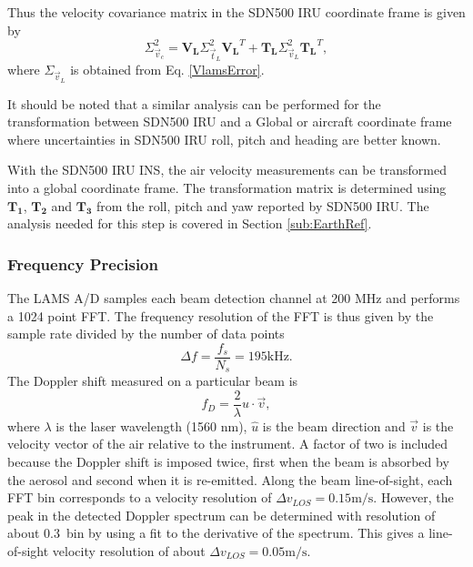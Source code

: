 \documentclass[12pt,twoside,english]{article}\usepackage[]{graphicx}\usepackage[]{color}
\begin{document}
Thus the velocity covariance matrix in the SDN500 IRU coordinate frame is given by  
\begin{equation}
\Sigma_{\vec{v}_{c}}^{2}=\mathbf{V_{L}}\Sigma_{\vec{t}_{L}}^{2}\mathbf{V_{L}}^{T}+\mathbf{T_{L}}\Sigma_{\vec{v}_{L}}^{2}\mathbf{T_{L}}^{T},\label{CMvelError} 
\end{equation}
where $\Sigma_{\vec{v}_{L}}$ is obtained from Eq. \eqref{VlamsError}. 

It should be noted that a similar analysis can be performed for the transformation between SDN500 IRU and a Global or aircraft coordinate frame where uncertainties in SDN500 IRU roll, pitch and heading are better known. 


With the SDN500 IRU INS, the air velocity measurements can be transformed into a global coordinate frame. The transformation matrix is determined using $\mathbf{T_{1}}$, $\mathbf{T_{2}}$ and $\mathbf{T_{3}}$ from the roll, pitch and yaw reported by SDN500 IRU. The analysis needed for this step is covered in Section \ref{sub:EarthRef}. 



\subsubsection{Frequency Precision\label{sub:FreqPrec}}

The LAMS A/D samples each beam detection channel at 200 MHz and performs a 1024 point FFT. The frequency resolution of the FFT is thus given by the sample rate divided by the number of data points  
\begin{equation}
\Delta f=\dfrac{f_{s}}{N_{s}}=195\mathrm{kHz}. 
\end{equation}
The Doppler shift measured on a particular beam is  
\begin{equation}
f_{D}=\frac{2}{\lambda}\hat{u}\cdot\vec{v},\label{DopplerShift} 
\end{equation}
where $\lambda$ is the laser wavelength (1560 nm), $\hat{u}$ is the beam direction and $\vec{v}$ is the velocity vector of the air relative to the instrument. A factor of two is included because the Doppler shift is imposed twice, first when the beam is absorbed by the aerosol and second when it is re-emitted. Along the beam line-of-sight, each FFT bin corresponds to a velocity resolution of $\Delta v_{LOS}=0.15\mathrm{m/s}$. 
However, the peak in the detected Doppler spectrum can be determined with resolution of about 0.3~bin by using a fit to the derivative of the spectrum. 
This gives a line-of-sight velocity resolution of about $\Delta v_{LOS}=0.05\mathrm{m/s}$. 
\end{document}
